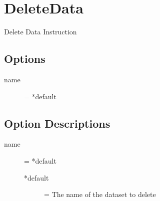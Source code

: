 \section{DeleteData}

Delete Data Instruction

\subsection{Options}
\begin{description}
\item[name] = *default
\end{description}

\subsection{Option Descriptions}
\begin{description}

\item[name] = *default
	\begin{description}
	\item[*default] = The name of the dataset to delete
	\end{description}
	
	
\end{description} 